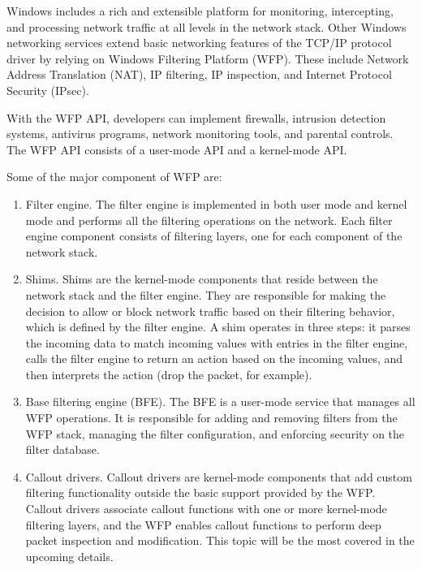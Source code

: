 \vspace{5mm}
\cite{BOOK:1} Windows includes a rich and extensible platform for monitoring, intercepting, and processing
network traffic at all levels in the network stack. Other Windows networking services extend basic
networking features of the TCP/IP protocol driver by relying on Windows Filtering Platform (WFP).
These include Network Address Translation (NAT), IP filtering, IP inspection, and Internet Protocol
Security (IPsec).

\vspace{5mm}

With the WFP API, developers can implement firewalls, intrusion detection systems, antivirus programs, network monitoring tools, and parental controls. The WFP API consists of a user-mode API and a kernel-mode API.

\vspace{5mm}

Some of the major component of WFP are:
\vspace{5mm}
\begin{enumerate}

\item Filter engine. The filter engine is implemented in both user mode and kernel mode and performs all the filtering operations on the network. Each filter engine component consists of
filtering layers, one for each component of the network stack.

\item Shims. Shims are the kernel-mode components that reside between the network stack and the filter engine. They are responsible for making the decision to allow or block network traffic
based on their filtering behavior, which is defined by the filter engine. A shim operates in three steps: it parses the incoming data to match incoming values with entries in the filter engine,
calls the filter engine to return an action based on the incoming values, and then interprets the action (drop the packet, for example).

\item Base filtering engine (BFE). The BFE is a user-mode service that manages all WFP operations. It is responsible for adding and removing filters from the WFP stack, managing the filter 
configuration, and enforcing security on the filter database.

\item Callout drivers. Callout drivers are kernel-mode components that add custom filtering functionality outside the basic support provided by the WFP. Callout drivers associate callout 
functions with one or more kernel-mode filtering layers, and the WFP enables callout functions to perform deep packet inspection and modification. This topic will be the most covered in the
upcoming details.

\end{enumerate}

